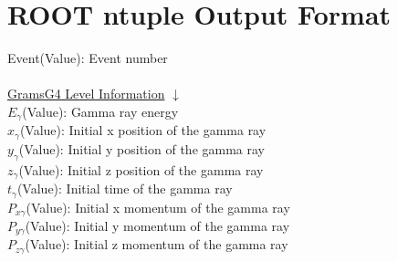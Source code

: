 \documentclass{article}
\begin{document}
\section*{\centering ROOT ntuple Output Format}
Event(Value): Event number\\
\\
\underline{GramsG4 Level Information} $\downarrow$ \\
$E_\gamma$(Value): Gamma ray energy\\
$x_\gamma$(Value): Initial x position of the gamma ray\\
$y_\gamma$(Value): Initial y position of the gamma ray\\
$z_\gamma$(Value): Initial z position of the gamma ray\\
$t_\gamma$(Value): Initial time of the gamma ray\\
$P_{x\gamma}$(Value): Initial x momentum of the gamma ray\\
$P_{y\gamma}$(Value): Initial y momentum of the gamma ray\\
$P_{z\gamma}$(Value): Initial z momentum of the gamma ray\\
\end{document}
